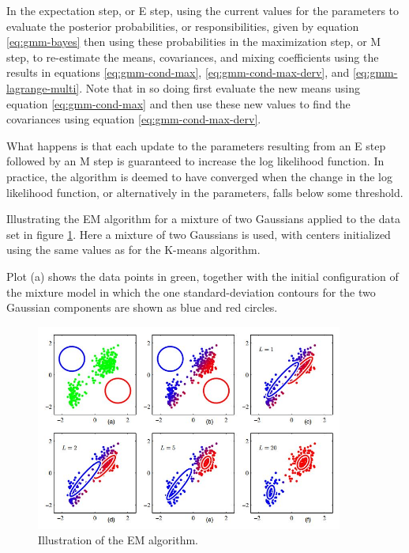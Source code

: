 \documentclass[12pt, a4paper, twoside]{report}
\begin{document}
\par
In the expectation step, or E step, using the current values for the parameters to evaluate the posterior probabilities, or responsibilities, given by equation \ref{eq:gmm-bayes} then using these probabilities in the maximization step, or M step, to re-estimate the means, covariances, and mixing coefficients using the results in equations \ref{eq:gmm-cond-max}, \ref{eq:gmm-cond-max-derv}, and \ref{eq:gmm-lagrange-multi}. Note that in so doing first evaluate the new means using equation \ref{eq:gmm-cond-max} and then use these new values to find the covariances using equation \ref{eq:gmm-cond-max-derv}.
\par
What happens is that each update to the parameters resulting from an E step followed by an M step is guaranteed to increase the log likelihood function. In practice, the algorithm is deemed to have converged when the change in the log likelihood function, or alternatively in the parameters, falls below some threshold.
\par
Illustrating the EM algorithm for a mixture of two Gaussians applied to the data set in figure \ref{fig:gmm-em}. Here a mixture of two Gaussians is used, with centers initialized using the same values as for the K-means algorithm.
\par
Plot (a) shows the data points in green, together with the initial configuration of the mixture model in which the one standard-deviation contours for the two Gaussian components are shown as blue and red circles.
\begin{figure}[!h]
	\centering
	\includegraphics[width=0.9\textwidth]
	{images/chapter4/gmm-em}
	\caption{Illustration of the EM algorithm.}
	\label{fig:gmm-em}
\end{figure}
\end{document}
